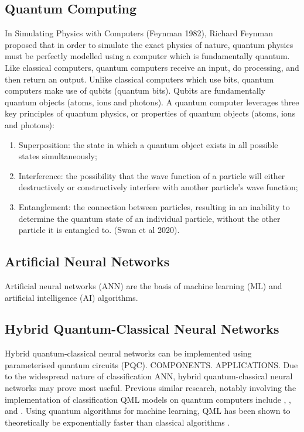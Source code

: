\documentclass{article}
\begin{document}
\subsection{Quantum Computing}
In Simulating Physics with Computers (Feynman 1982), Richard Feynman proposed that in order to simulate the exact physics of nature, quantum physics must be perfectly modelled using a computer which is fundamentally quantum. Like classical computers, quantum computers receive an input, do processing, and then return an output. Unlike classical computers which use bits, quantum computers make use of qubits (quantum bits). Qubits are fundamentally quantum objects (atoms, ions and photons). A quantum computer leverages three key principles of quantum physics, or properties of quantum objects (atoms, ions and photons):
\begin{enumerate}
\item Superposition: the state in which a quantum object exists in all possible states simultaneously;
\item Interference: the possibility that the wave function of a particle will either destructively or constructively interfere with another particle’s wave function;
\item Entanglement: the connection between particles, resulting in an inability to determine the quantum state of an individual particle, without the other particle it is entangled to.
(Swan et al 2020).
\end{enumerate}

\subsection{Artificial Neural Networks}
Artificial neural networks (ANN) are the basis of machine learning (ML) and artificial intelligence (AI) algorithms.

\subsection{Hybrid Quantum-Classical Neural Networks}
Hybrid quantum-classical neural networks can be implemented using parameterised quantum circuits (PQC). COMPONENTS. APPLICATIONS. Due to the widespread nature of classification ANN, hybrid quantum-classical neural networks may prove most useful. Previous similar research, notably involving the implementation of classification QML models on quantum computers include \cite{Schuld2017}, \cite{Grant2018}, \cite{Havlicek2019a} and \cite{Tacchino2019}. Using quantum algorithms for machine learning, QML has been shown to theoretically be exponentially faster than classical algorithms \cite{Lloyd2013}.
\end{document}
